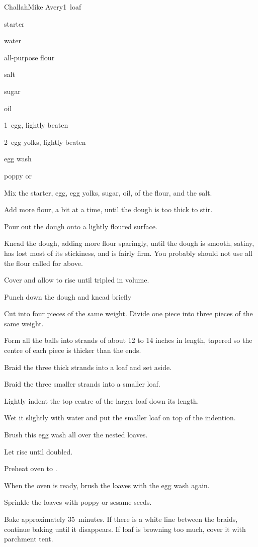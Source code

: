\begin{recipe}{Challah\FIXME}{Mike Avery}{1~loaf}

\begin{ingredients}
\item {} starter
\item \C{\half} water
\item \C{3\twothird} all-purpose flour
\item {} salt
\item \C{\quarter} sugar
\item \C{\quarter} oil
\item 1~egg, lightly beaten
\item 2~egg yolks, lightly beaten
\item egg wash
\item poppy or 
\end{ingredients}

\begin{directions}
\item Mix the starter, egg, egg yolks, sugar, oil, \half{} of the flour, and the salt. 
\item Add more flour, a bit at a time, until the dough is too thick to stir.
\item Pour out the dough onto a lightly floured surface.
\item Knead the dough, adding more flour sparingly, until the dough is smooth, satiny, has lost most of its stickiness, and is fairly firm. You probably should not use all the flour called for above.
\item Cover and allow to rise until tripled in volume.
\item Punch down the dough and knead briefly
\item Cut into four pieces of the same weight. Divide one piece into three pieces of the same weight.
\item Form all the balls into strands of about 12 to 14 inches in length, tapered so the centre of each piece is thicker than the ends.
\item Braid the three thick strands into a loaf and set aside.
\item Braid the three smaller strands into a smaller loaf.
\item Lightly indent the top centre of the larger loaf down its length.
\item Wet it slightly with water and put the smaller loaf on top of the indention.
\item Brush this egg wash all over the nested loaves.
\item Let rise until doubled.
\item Preheat oven to .
\item When the oven is ready, brush the loaves with the egg wash again.
\item Sprinkle the loaves with poppy or sesame seeds.
\item Bake approximately 35~minutes. If there is a white line between the braids, continue baking until it disappears. If loaf is browning too much, cover it with parchment tent.
\end{directions}

\end{recipe}
